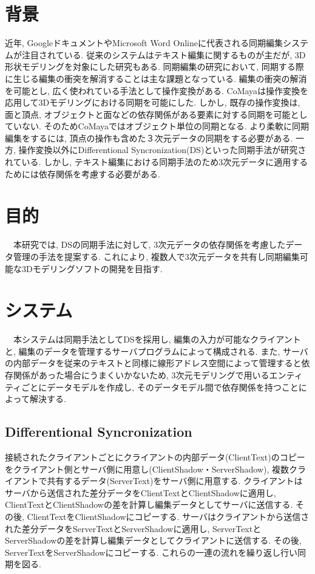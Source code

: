 \documentclass{AIabst}
\begin{document}
\makeAbstHeader
%
%
%
\section{背景}
	近年, GoogleドキュメントやMicrosoft Word Onlineに代表される同期編集システムが注目されている.
	従来のシステムはテキスト編集に関するものが主だが, 3D形状モデリングを対象にした研究もある.
	同期編集の研究において, 同期する際に生じる編集の衝突を解消することは主な課題となっている.
	編集の衝突の解消を可能とし, 広く使われている手法として操作変換がある.
	CoMaya\cite{COMAYA}は操作変換を応用して3Dモデリングにおける同期を可能にした.
	しかし, 既存の操作変換は, 面と頂点, オブジェクトと面などの依存関係がある要素に対する同期を可能としていない.
	そのためCoMayaではオブジェクト単位の同期となる.
	より柔軟に同期編集をするには, 頂点の操作も含めた３次元データの同期をする必要がある.
	一方, 操作変換以外にDifferentional Syncronization(DS)\cite{DS}といった同期手法が研究されている.
	しかし, テキスト編集における同期手法のため3次元データに適用するためには依存関係を考慮する必要がある.

\section{目的}
　本研究では, DSの同期手法に対して, 3次元データの依存関係を考慮したデータ管理の手法を提案する.
  これにより, 複数人で3次元データを共有し同期編集可能な3Dモデリングソフトの開発を目指す.
\section{システム}
　本システムは同期手法としてDSを採用し, 編集の入力が可能なクライアントと, 編集のデータを管理するサーバプログラムによって構成される.
  また, サーバの内部データを従来のテキストと同様に線形アドレス空間によって管理すると依存関係があった場合にうまくいかないため,
  3次元モデリングで用いるエンティティごとにデータモデルを作成し, そのデータモデル間で依存関係を持つことによって解決する.
  \subsection{Differentional Syncronization}
  接続されたクライアントごとにクライアントの内部データ(ClientText)のコピーをクライアント側とサーバ側に用意し(ClientShadow・ServerShadow),
  複数クライアントで共有するデータ(ServerText)をサーバ側に用意する.
  クライアントはサーバから送信された差分データをClientTextとClientShadowに適用し, ClientTextとClientShadowの差を計算し編集データとしてサーバに送信する.
  その後, ClientTextをClientShadowにコピーする.
  サーバはクライアントから送信された差分データをServerTextとServerShadowに適用し, ServerTextとServerShadowの差を計算し編集データとしてクライアントに送信する.
  その後, ServerTextをServerShadowにコピーする.
  これらの一連の流れを繰り返し行い同期を図る.
\end{document}
